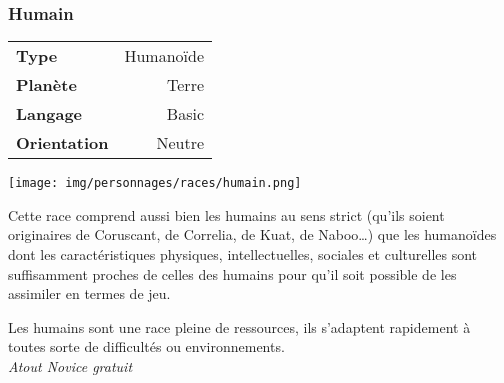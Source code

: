 \subsubsection{Humain}
\begin{samepage}
	\begin{flushright}
		\begin{tabular}{|l|r|}
			\textbf{Type} 			& Humanoïde \\
		   	\textbf{Planète} 		& Terre \\
		   	\textbf{Langage} 		& Basic \\
		   	\textbf{Orientation} 	& Neutre \\
		\end{tabular}
	\end{flushright}

	\vspace{-6\baselineskip}
	\texttt{[image: img/personnages/races/humain.png]} 
\end{samepage}

Cette race comprend aussi bien les humains au sens strict (qu’ils soient originaires de Coruscant, de Correlia, de Kuat, de Naboo\ldots) que les humanoïdes dont les caractéristiques physiques, intellectuelles, sociales et culturelles sont suffisamment proches de celles des humains pour qu’il soit possible de les assimiler en termes de jeu.

\begin{description}[align=left]
\item [Adaptabilité] 	%
	Les humains sont une race pleine de ressources, ils s’adaptent rapidement à toutes sorte de difficultés ou environnements.\\
	\textit{Atout Novice gratuit}
\end{description}